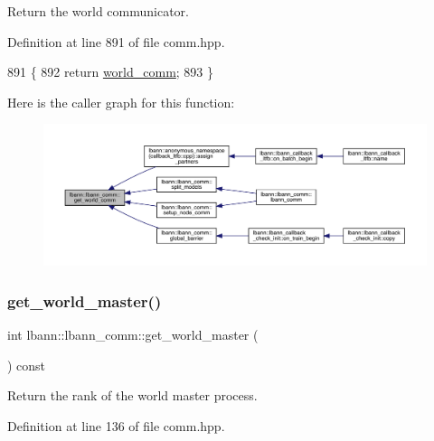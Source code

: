 Return the world communicator. 

Definition at line 891 of file comm.\+hpp.


\begin{DoxyCode}
891                                          \{
892     \textcolor{keywordflow}{return} \hyperlink{classlbann_1_1lbann__comm_a1fc59c935580eab2ce8e60464a45ef39}{world\_comm};
893   \}
\end{DoxyCode}
Here is the caller graph for this function\+:\nopagebreak
\begin{figure}[H]
\begin{center}
\leavevmode
\includegraphics[width=350pt]{classlbann_1_1lbann__comm_a0493f1f0c42b95674daacf5288fdb073_icgraph}
\end{center}
\end{figure}
\mbox{\label{classlbann_1_1lbann__comm_aa682313f366e0b7cf781bc1872911f65}} 
\subsubsection{\texorpdfstring{get\+\_\+world\+\_\+master()}{get\_world\_master()}}
{\footnotesize\ttfamily int lbann\+::lbann\+\_\+comm\+::get\+\_\+world\+\_\+master (\begin{DoxyParamCaption}{ }\end{DoxyParamCaption}) const\hspace{0.3cm}{\ttfamily [inline]}}

Return the rank of the world master process. 

Definition at line 136 of file comm.\+hpp.


